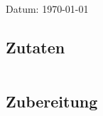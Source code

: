 \documentclass[fontsize=15pt,paper=a4]{scrdoc}
\begin{document}
\section*{}
\vspace{-15pt}
\begin{center}
    \scriptsize Datum: \today
\end{center}
\subsection*{Zutaten}
\begin{tabularx}{\textwidth}{XX}
    
\end{tabularx}

\subsection*{Zubereitung}
\begin{enumerate}
    
\end{enumerate}
\end{document}
